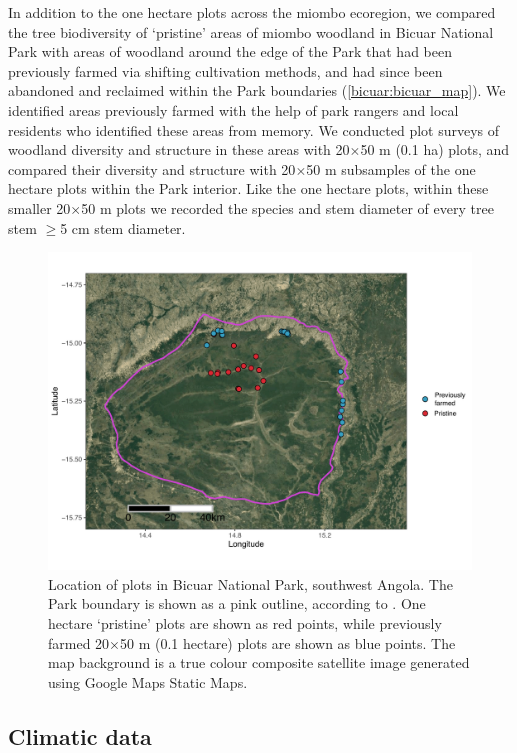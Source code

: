 \begin{refsection}
In addition to the one hectare plots across the miombo ecoregion, we compared the tree biodiversity of `pristine' areas of miombo woodland in Bicuar National Park with areas of woodland around the edge of the Park that had been previously farmed via shifting cultivation methods, and had since been abandoned and reclaimed within the Park boundaries (\autoref{bicuar:bicuar_map}). We identified areas previously farmed with the help of park rangers and local residents who identified these areas from memory. We conducted \ndegradplots{} plot surveys of woodland diversity and structure in these areas with 20$\times$50 m (0.1 ha) plots, and compared their diversity and structure with 20$\times$50 m subsamples of the \nplotsbicuar{} one hectare plots within the Park interior. Like the one hectare plots, within these smaller 20$\times$50 m plots we recorded the species and stem diameter of every tree stem $\ge$5 cm stem diameter.

\begin{figure}
	\includegraphics[width=\linewidth]{img/bicuar_map}
	\caption[Location of plots within Bicuar National Park]{Location of plots in Bicuar National Park, southwest Angola. The Park boundary is shown as a pink outline, according to \citet{WDPA2019}. One hectare `pristine' plots are shown as red points, while previously farmed 20$\times$50 m (0.1 hectare) plots are shown as blue points. The map background is a true colour composite satellite image generated using Google Maps Static Maps.}
	\label{bicuar:bicuar_map}
\end{figure}

\subsection{Climatic data}
\label{bicuar:ssec:climate}


\end{refsection}
